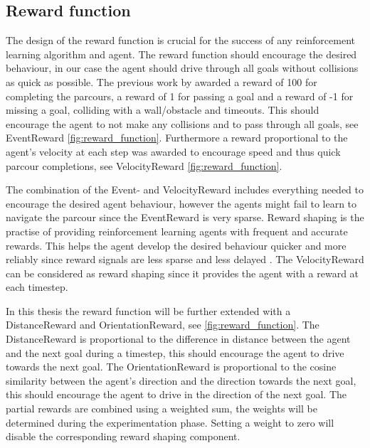 \subsection{Reward function}

The design of the reward function is crucial for the success of any reinforcement learning algorithm and agent. The reward function should encourage the desired behaviour, in our case the agent should drive through all goals without collisions as quick as possible. The previous work by \autocite{maximilian} awarded a reward of 100 for completing the parcours, a reward of 1 for passing a goal and a reward of -1 for missing a goal, colliding with a wall/obstacle and timeouts. This should encourage the agent to not make any collisions and to pass through all goals, see EventReward \ref{fig:reward_function}. Furthermore a reward proportional to the agent's velocity at each step was awarded to encourage speed and thus quick parcour completions, see VelocityReward \ref{fig:reward_function}. 

The combination of the Event- and VelocityReward includes everything needed to encourage the desired agent behaviour, however the agents might fail to learn to navigate the parcour since the EventReward is very sparse. Reward shaping is the practise of providing reinforcement learning agents with frequent and accurate rewards. This helps the agent develop the desired behaviour quicker and more reliably since reward signals are less sparse and less delayed \autocite{drl_for_ad}. The VelocityReward can be considered as reward shaping since it provides the agent with a reward at each timestep.

In this thesis the reward function will be further extended with a DistanceReward and OrientationReward, see \ref{fig:reward_function}. The DistanceReward is proportional to the difference in distance between the agent and the next goal during a timestep, this should encourage the agent to drive towards the next goal. The OrientationReward is proportional to the cosine similarity between the agent's direction and the direction towards the next goal, this should encourage the agent to drive in the direction of the next goal. The partial rewards are combined using a weighted sum, the weights will be determined during the experimentation phase. Setting a weight to zero will disable the corresponding reward shaping component.


